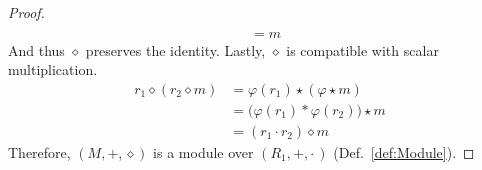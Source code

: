 \begin{proof}
\begin{align}
            \tag{Identity Property of Homomorphisms}\\
            &=m
            \tag{Identity Property of Modules}
        \end{align}
        And thus $\diamond$ preserves the identity. Lastly, $\diamond$ is
        compatible with scalar multiplication.
        \begin{align}
            r_{1}\diamond(r_{2}\diamond{m})
            &=\varphi(r_{1})\star(\varphi\star{m})
            \tag{Definition of $\diamond$}\\
            &=\big(\varphi(r_{1})*\varphi(r_{2})\big)\star{m}
            \tag{Module Compatibility with Multiplication}\\
            &=(r_{1}\cdot{r}_{2})\diamond{m}
            \tag{Definition of $\diamond$}
        \end{align}
        Therefore, $(M,\boldsymbol{+},\diamond)$ is a module over
        $(R_{1},+,\cdot\,)$ (Def.~\ref{def:Module}).
    \end{proof}
